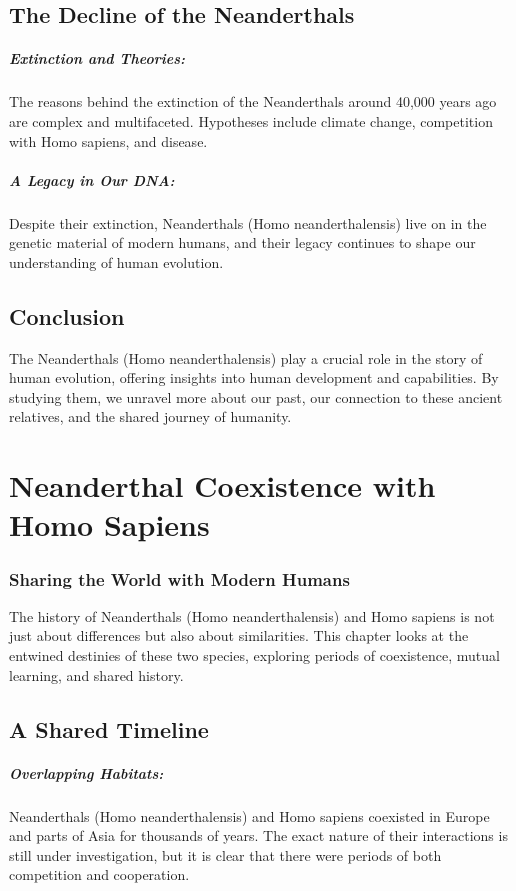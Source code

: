 \documentclass{book}
\begin{document}
\section*{The Decline of the Neanderthals}

\paragraph{Extinction and Theories:}
The reasons behind the extinction of the Neanderthals around 40,000 years ago are complex and multifaceted. Hypotheses include climate change, competition with Homo sapiens, and disease.

\paragraph{A Legacy in Our DNA:}
Despite their extinction, Neanderthals (Homo neanderthalensis) live on in the genetic material of modern humans, and their legacy continues to shape our understanding of human evolution.

\section*{Conclusion}

The Neanderthals (Homo neanderthalensis) play a crucial role in the story of human evolution, offering insights into human development and capabilities. By studying them, we unravel more about our past, our connection to these ancient relatives, and the shared journey of humanity.

\chapter{Neanderthal Coexistence with Homo Sapiens}
\subsection*{Sharing the World with Modern Humans}
The history of Neanderthals (Homo neanderthalensis) and Homo sapiens is not just about differences but also about similarities. This chapter looks at the entwined destinies of these two species, exploring periods of coexistence, mutual learning, and shared history.

\section*{A Shared Timeline}

\paragraph{Overlapping Habitats:}
Neanderthals (Homo neanderthalensis) and Homo sapiens coexisted in Europe and parts of Asia for thousands of years. The exact nature of their interactions is still under investigation, but it is clear that there were periods of both competition and cooperation.
\end{document}
